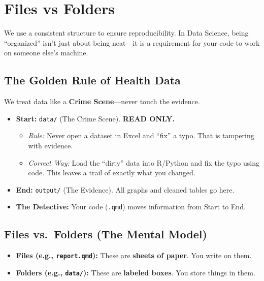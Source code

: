 \documentclass[
  letterpaper,
  DIV=11,
  numbers=noendperiod,
  oneside]{scrreprt}
\providecommand{\tightlist}{%
  \setlength{\itemsep}{0pt}\setlength{\parskip}{0pt}}
\begin{document}
\chapter{Files vs Folders}\label{files-vs-folders}

We use a consistent structure to ensure reproducibility. In Data
Science, being ``organized'' isn't just about being neat---it is a
requirement for your code to work on someone else's machine.

\section{The Golden Rule of Health
Data}\label{the-golden-rule-of-health-data}

We treat data like a \textbf{Crime Scene}---never touch the evidence.

\begin{itemize}
\tightlist
\item
  \textbf{Start:} \texttt{data/} (The Crime Scene). \textbf{READ ONLY.}

  \begin{itemize}
  \tightlist
  \item
    \emph{Rule:} Never open a dataset in Excel and ``fix'' a typo. That
    is tampering with evidence.
  \item
    \emph{Correct Way:} Load the ``dirty'' data into R/Python and fix
    the typo using code. This leaves a trail of exactly what you
    changed.
  \end{itemize}
\item
  \textbf{End:} \texttt{output/} (The Evidence). All graphs and cleaned
  tables go here.
\item
  \textbf{The Detective:} Your code (\texttt{.qmd}) moves information
  from Start to End.
\end{itemize}

\section{Files vs.~Folders (The Mental
Model)}\label{files-vs.-folders-the-mental-model}

\begin{itemize}
\tightlist
\item
  \textbf{Files (e.g., \texttt{report.qmd}):} These are \textbf{sheets
  of paper}. You write on them.
\item
  \textbf{Folders (e.g., \texttt{data/}):} These are \textbf{labeled
  boxes}. You store things in them.
\end{itemize}
\end{document}
